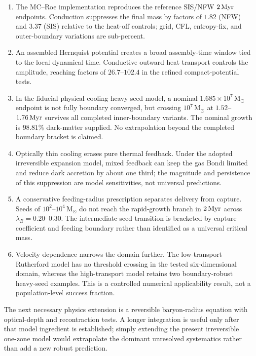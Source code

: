 \documentclass[11pt]{article}
\newcommand{\msun}{\,\mathrm{M}_{\odot}}
\begin{document}
\begin{enumerate}
 \item The MC--Roe implementation reproduces the reference SIS/NFW $2\,{\rm Myr}$ endpoints.  Conduction suppresses the final mass by factors of $1.82$ (NFW) and $3.37$ (SIS) relative to the heat-off controls; grid, CFL, entropy-fix, and outer-boundary variations are sub-percent.
 \item An assembled Hernquist potential creates a broad assembly-time window tied to the local dynamical time.  Conductive outward heat transport controls the amplitude, reaching factors of $26.7$--$102.4$ in the refined compact-potential tests.
 \item In the fiducial physical-cooling heavy-seed model, a nominal $1.685\times10^7\msun$ endpoint is not fully boundary converged, but crossing $10^7\msun$ at $1.52$--$1.76\,{\rm Myr}$ survives all completed inner-boundary variants.  The nominal growth is $98.81\%$ dark-matter supplied.  No extrapolation beyond the completed boundary bracket is claimed.
 \item Optically thin cooling erases pure thermal feedback.  Under the adopted irreversible expansion model, mixed feedback can keep the gas Bondi limited and reduce dark accretion by about one third; the magnitude and persistence of this suppression are model sensitivities, not universal predictions.
 \item A conservative feeding-radius prescription separates delivery from capture.  Seeds of $10^2$--$10^4\msun$ do not reach the rapid-growth branch in $2\,{\rm Myr}$ across $\lambda_B=0.20$--$0.30$.  The intermediate-seed transition is bracketed by capture coefficient and feeding boundary rather than identified as a universal critical mass.
 \item Velocity dependence narrows the domain further.  The low-transport Rutherford model has no threshold crossing in the tested six-dimensional domain, whereas the high-transport model retains two boundary-robust heavy-seed examples.  This is a controlled numerical applicability result, not a population-level success fraction.
\end{enumerate}

The next necessary physics extension is a reversible baryon-radius equation with optical-depth and recontraction tests.  A longer integration is useful only after that model ingredient is established; simply extending the present irreversible one-zone model would extrapolate the dominant unresolved systematics rather than add a new robust prediction.
\end{document}
